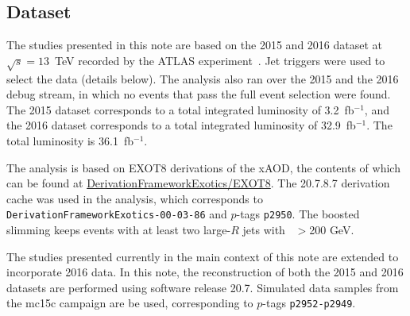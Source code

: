 \subsection{Dataset}

The studies presented in this note are based on the 2015 and 2016 dataset at $\sqrt{s}=13$~TeV recorded by the ATLAS experiment~\cite{detPaper}. Jet triggers were used to select the data (details below). The analysis also ran over the 2015 and the 2016 debug stream, in which no events that pass the full event selection were found. The 2015 dataset corresponds to a total integrated luminosity of 3.2\, fb$^{-1}$, and the 2016 dataset corresponds to a total integrated luminosity of 32.9\, fb$^{-1}$. The total luminosity is 36.1\, fb$^{-1}$.

The analysis is based on EXOT8 derivations of the xAOD, the contents of which can be found at \href{https://svnweb.cern.ch/trac/atlasoff/browser/PhysicsAnalysis/DerivationFramework/DerivationFrameworkExotics/trunk/share/EXOT8.py}{DerivationFrameworkExotics/EXOT8}. The 20.7.8.7 derivation cache was used in the analysis, which corresponds to \texttt{DerivationFrameworkExotics-00-03-86} and $p$-tags \texttt{p2950}. The boosted slimming keeps events with at least two large-$R$ jets with \pt~$>$200 GeV. 

The studies presented currently in the main context of this note are extended to incorporate 2016 data. In this note, the reconstruction of both the 2015 and 2016 datasets are performed using software release 20.7. Simulated data samples from the mc15c campaign are be used, corresponding to $p$-tags \texttt{p2952-p2949}.

